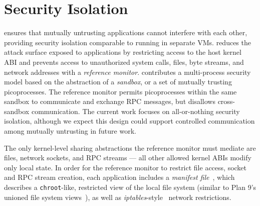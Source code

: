 \section{Security Isolation}
\label{sec:linux:security}

\graphene{} ensures that mutually untrusting applications 
cannot interfere with each other, providing security isolation
comparable to running in separate VMs.
\graphene{} reduces the attack surface exposed to applications
by restricting access to the host kernel ABI 
and prevents access to unauthorized system calls, files, byte streams,
and network addresses with a \emph{reference monitor}.
\graphene{} contributes a multi-process security model 
based on the abstraction of a \emph{sandbox},
or a set of mutually trusting picoprocesses.
The reference monitor permits picoprocesses within the same sandbox
to communicate and exchange RPC messages, but disallows cross-sandbox communication.
The current work focuses on all-or-nothing security isolation, although we expect
this design could support
controlled communication among mutually untrusting \liboses{}
in future work.

The only kernel-level sharing abstractions the reference monitor must mediate
are files, network sockets, and RPC streams
--- all other allowed kernel ABIs
modify only local \picoproc{} state.
In order for the reference monitor to restrict file access, socket and RPC stream creation,
each application includes a \emph{manifest file}~\cite{hunt07rethink},
which describes a {\tt chroot}-like, restricted view of the local 
file system (similar to Plan 9's unioned file system views~\cite{pike90plan9}),
as well as \emph{iptables}-style~\cite{iptablesman} network restrictions.


